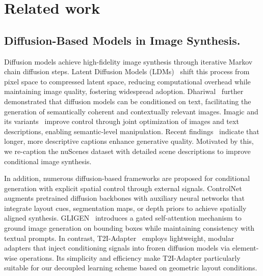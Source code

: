 \section{Related work}
\subsection{Diffusion-Based Models in Image Synthesis.}
Diffusion models achieve high-fidelity image synthesis through iterative Markov chain diffusion steps. Latent Diffusion Models (LDMs)~\cite{rombach2022high} shift this process from pixel space to compressed latent space, reducing computational overhead while maintaining image quality, fostering widespread adoption. Dhariwal~\cite{dhariwal2021diffusion} further demonstrated that diffusion models can be conditioned on text, facilitating the generation of semantically coherent and contextually relevant images. Imagic and its variants~\cite{kawar2023i, brack2024ledits++} improve control through joint optimization of images and text descriptions, enabling semantic-level manipulation. Recent findings~\cite{lian2024llmgrounded, wu2025paragraph} indicate that longer, more descriptive captions enhance generative quality. Motivated by this, we re-caption the nuScenes dataset with detailed scene descriptions to improve conditional image synthesis.

In addition, numerous diffusion-based frameworks are proposed for conditional generation with explicit spatial control through external signals.
ControlNet~\cite{zhang2023adding} augments pretrained diffusion backbones with auxiliary neural networks that integrate layout cues, segmentation maps, or depth priors to achieve spatially aligned synthesis.
GLIGEN~\cite{li2023gligen} introduces a gated self-attention mechanism to ground image generation on bounding boxes while maintaining consistency with textual prompts.
In contrast, T2I-Adapter~\cite{mou2024t2i} employs lightweight, modular adapters that inject conditioning signals into frozen diffusion models via element-wise operations.
Its simplicity and efficiency make T2I-Adapter particularly suitable for our decoupled learning scheme based on geometric layout conditions.
